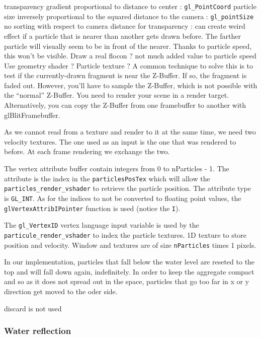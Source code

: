 \documentclass[a4paper,11pt]{article}
\begin{document}
transparency gradient proportional to distance to center : \texttt{gl\_PointCoord}
particle size inversely proportional to the squared distance to the camera : \texttt{gl\_pointSize}
no sorting with respect to camera distance for transparency : can create weird effect if a particle that is nearer than another gets drawn before. The farther particle will visually seem to be in front of the nearer. Thanks to particle speed, this won't be visible.
Draw a real flocon ? not much added value to particle speed
Use geometry shader ?
Particle texture ?
A common technique to solve this is to test if the currently-drawn fragment is near the Z-Buffer. If so, the fragment is faded out. However, you’ll have to sample the Z-Buffer, which is not possible with the “normal” Z-Buffer. You need to render your scene in a render target. Alternatively, you can copy the Z-Buffer from one framebuffer to another with glBlitFramebuffer.

As we cannot read from a texture and render to it at the same time, we need two velocity textures. The one used as an input is the one that was rendered to before. At each frame rendering we exchange the two.

The vertex attribute buffer contain integers from 0 to nParticles - 1. The attribute is the index in the \texttt{particlesPosTex} which will allow the \texttt{particles\_render\_vshader} to retrieve the particle position. The attribute type is \texttt{GL\_INT}. As for the indices to not be converted to floating point values, the \texttt{glVertexAttribIPointer} function is used (notice the \texttt{I}).

The \texttt{gl\_VertexID} vertex language input variable is used by the \texttt{particule\_render\_vshader} to index the particle textures.
1D texture to store position and velocity.
Window and textures are of size \texttt{nParticles} times 1 pixels.

In our implementation, particles that fall below the water level are reseted to the top and will fall down again, indefinitely. In order to keep the aggregate compact and so as it does not spread out in the space, particles that go too far in x or y direction get moved to the oder side.

discard is not used

\subsubsection{Water reflection}
\end{document}
